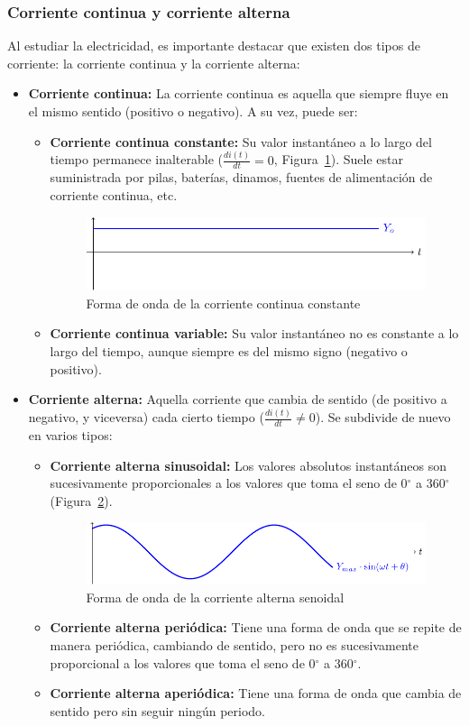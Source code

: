 \documentclass[11pt]{book} %
\begin{document}
	\subsubsection{Corriente continua y corriente alterna} \label{sec.cc-ca}
	Al estudiar la electricidad, es importante destacar que existen dos tipos de corriente: la corriente continua y la corriente alterna:
	\begin{itemize}
		\item \textbf{Corriente continua:} La corriente continua es aquella que siempre fluye en el mismo sentido (positivo o negativo). A su vez, puede ser:
		\begin{itemize}
			\item \textbf{Corriente continua constante:} Su valor instantáneo a lo largo del tiempo permanece inalterable ($\frac{di(t)}{dt} = 0$, Figura~\ref{fig.continua}). Suele estar suministrada por pilas, baterías, dinamos, fuentes de alimentación de corriente continua, etc. 
			\begin{figure}[htbp]
				\centering
				\includegraphics[width=0.75\linewidth]{../figs/continua.pdf}
				\caption{Forma de onda de la corriente continua constante}
				\label{fig.continua}
			\end{figure}
			\item \textbf{Corriente continua variable:} Su valor instantáneo no es constante a lo largo del tiempo, aunque siempre es del mismo signo (negativo o positivo). 
		\end{itemize}
		\item \textbf{Corriente alterna:} Aquella corriente que cambia de sentido (de positivo a negativo, y viceversa) cada cierto tiempo ($\frac{di(t)}{dt} \neq 0$). Se subdivide de nuevo en varios tipos:
		\begin{itemize}
			\item \textbf{Corriente alterna sinusoidal:} Los valores absolutos instantáneos son sucesivamente proporcionales a los valores que toma el seno de 0$^\circ$ a 360$^\circ$ (Figura~\ref{fig.sin}).
			\begin{figure}[htbp]
				\centering
				\includegraphics[width=0.75\linewidth]{../figs/sin.pdf}
				\caption{Forma de onda de la corriente alterna senoidal}
				\label{fig.sin}
			\end{figure}
			\item \textbf{Corriente alterna periódica:} Tiene una forma de onda que se repite de manera periódica, cambiando de sentido, pero no es sucesivamente proporcional a los valores que toma el seno de 0$^\circ$ a 360$^\circ$.
			\item \textbf{Corriente alterna aperiódica:} Tiene una forma de onda que cambia de sentido pero sin seguir ningún periodo.
		\end{itemize}
	\end{itemize}
\end{document}
